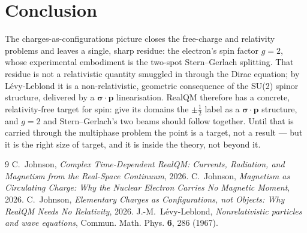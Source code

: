 \documentclass[11pt]{article}
\begin{document}
\section{Conclusion}
\label{sec:concl}

The charges-as-configurations picture closes the free-charge and relativity problems and leaves a single,
sharp residue: the electron's spin factor $g=2$, whose experimental embodiment is the two-spot
Stern--Gerlach splitting. That residue is not a relativistic quantity smuggled in through the Dirac
equation; by Lévy-Leblond it is a non-relativistic, geometric consequence of the SU(2) spinor structure,
delivered by a $\boldsymbol\sigma\cdot\mathbf p$ linearisation. RealQM therefore has a concrete,
relativity-free target for spin: give its domains the $\pm\tfrac12$ label as a $\boldsymbol\sigma\cdot
\mathbf p$ structure, and $g=2$ and Stern--Gerlach's two beams should follow together. Until that is
carried through the multiphase problem the point is a target, not a result --- but it is the right size of
target, and it is inside the theory, not beyond it.

\begin{thebibliography}{9}
 C.~Johnson, \emph{Complex Time-Dependent RealQM: Currents, Radiation, and
Magnetism from the Real-Space Continuum}, 2026.
 C.~Johnson, \emph{Magnetism as Circulating Charge: Why the Nuclear Electron
Carries No Magnetic Moment}, 2026.
 C.~Johnson, \emph{Elementary Charges as Configurations, not Objects: Why RealQM Needs No
Relativity}, 2026.
 J.-M.~Lévy-Leblond, \emph{Nonrelativistic particles and wave equations},
Commun. Math. Phys. \textbf{6}, 286 (1967).
\end{thebibliography}
\end{document}
